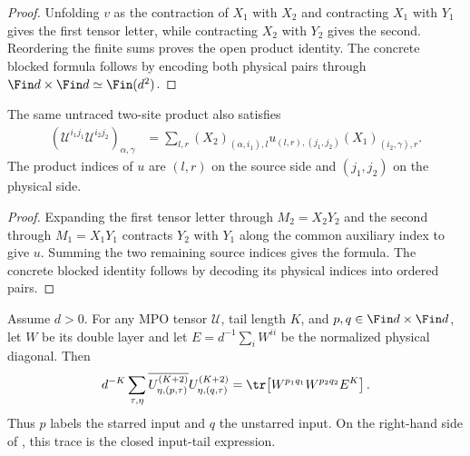 \begin{proof}\leanok
    Unfolding $v$ as the contraction of $X_1$ with $X_2$ and contracting $X_1$
    with $Y_1$ gives the first tensor letter, while contracting $X_2$ with
    $Y_2$ gives the second. Reordering the finite sums proves the open product
    identity. The concrete blocked formula follows by encoding both physical
    pairs through $\Fin d\times\Fin d\simeq\Fin(d^2)$.
\end{proof}

\begin{lemma}
    \label{thm:mpu_source_u_open_two_site}
    \leanok
    The same untraced two-site product also satisfies
    \begin{align}
        (\mathcal U^{i_1j_1}\mathcal U^{i_2j_2})_{\alpha,\gamma}
         & =\sum_{l,r}(X_2)_{(\alpha,i_1),l}
        u_{(l,r),(j_1,j_2)}(X_1)_{(i_2,\gamma),r}.
    \end{align}
    The product indices of $u$ are $(l,r)$ on the source side and
    $(j_1,j_2)$ on the physical side.
\end{lemma}

\begin{proof}\leanok
    Expanding the first tensor letter through $M_2=X_2Y_2$ and the second through
    $M_1=X_1Y_1$ contracts $Y_2$ with $Y_1$ along the common auxiliary index to
    give $u$. Summing the two remaining source indices gives the formula. The
    concrete blocked identity follows by decoding its physical indices into
    ordered pairs.
\end{proof}

\begin{lemma}
    \label{thm:mpu_normalized_input_tail_closed_trace}
    \leanok
    Assume $d>0$. For any MPO tensor $\mathcal U$, tail length $K$, and
    $p,q\in\Fin d\times\Fin d$, let $W$ be its double layer and let
    $E=d^{-1}\sum_i W^{ii}$ be the normalized physical diagonal. Then
    \begin{align}
        d^{-K}\sum_{\tau,\eta}
        \overline{U^{(K+2)}_{\eta,(p,\tau)}}
        U^{(K+2)}_{\eta,(q,\tau)}
        =\tr\!\left[W^{p_1q_1}W^{p_2q_2}E^K\right].
    \end{align}
    Thus $p$ labels the starred input and $q$ the unstarred input. On the right-hand side of \cite[equation~\texttt{uUnitary} and lines~550--556]{Cirac2017MPU}, this trace is
    the closed input-tail
    expression.
\end{lemma}

